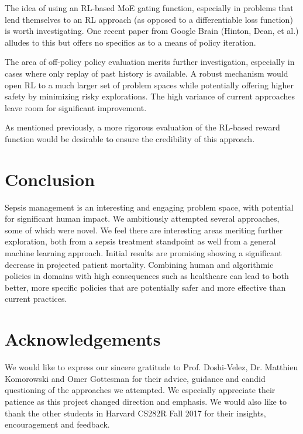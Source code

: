 \documentclass[letterpaper]{article}
\begin{document}
The idea of using an RL-based MoE gating function, especially in problems that lend themselves
to an RL approach (as opposed to a differentiable loss function) is worth investigating.
One recent paper \cite{shazeer2017outrageously} from Google Brain (Hinton, Dean, et al.) alludes
to this but offers no specifics as to a means of policy iteration. 

The area of off-policy policy evaluation merits further investigation, especially in cases
where only replay of past history is available. A robust mechanism would open RL to a much
larger set of problem spaces while potentially offering higher safety by minimizing risky explorations.
The high variance of current approaches leave room for significant improvement.

As mentioned previously, a more rigorous evaluation of the RL-based reward function
would be desirable to ensure the credibility of this approach.

\section{Conclusion}

Sepsis management is an interesting and engaging problem space, with potential for
significant human impact. We ambitiously attempted several approaches, some of which were
novel. We feel there are interesting areas meriting further exploration, both from a sepsis
treatment standpoint as well from a general machine learning approach. Initial results 
are promising showing a significant decrease in projected patient mortality. Combining human
and algorithmic policies in domains with high consequences such as healthcare can lead
to both better, more specific policies that are potentially safer and more effective
than current practices.

\section*{Acknowledgements}

We would like to express our sincere gratitude to Prof. Doshi-Velez, Dr. Matthieu Komorowski
and Omer Gottesman for their
advice, guidance and candid questioning of the approaches we attempted. We especially appreciate their
patience as this project changed direction and emphasis. We would also like to thank the other
students in Harvard CS282R Fall 2017 for their insights, encouragement and feedback.
\end{document}
